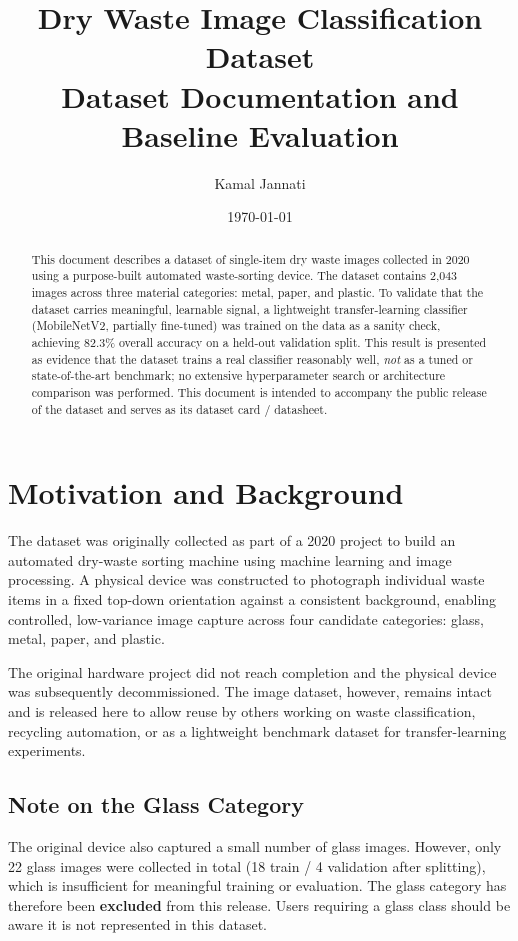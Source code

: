 \documentclass[11pt]{article}
\title{Dry Waste Image Classification Dataset \\ \large Dataset Documentation and Baseline Evaluation}
\author{Kamal Jannati}
\date{\today}
\begin{document}
\maketitle

\begin{abstract}
This document describes a dataset of single-item dry waste images collected in 2020 using a purpose-built automated waste-sorting device. The dataset contains 2{,}043 images across three material categories: metal, paper, and plastic. To validate that the dataset carries meaningful, learnable signal, a lightweight transfer-learning classifier (MobileNetV2, partially fine-tuned) was trained on the data as a sanity check, achieving 82.3\% overall accuracy on a held-out validation split. This result is presented as evidence that the dataset trains a real classifier reasonably well, \emph{not} as a tuned or state-of-the-art benchmark; no extensive hyperparameter search or architecture comparison was performed. This document is intended to accompany the public release of the dataset and serves as its dataset card / datasheet.
\end{abstract}

\tableofcontents

\section{Motivation and Background}

The dataset was originally collected as part of a 2020 project to build an automated dry-waste sorting machine using machine learning and image processing. A physical device was constructed to photograph individual waste items in a fixed top-down orientation against a consistent background, enabling controlled, low-variance image capture across four candidate categories: glass, metal, paper, and plastic.

The original hardware project did not reach completion and the physical device was subsequently decommissioned. The image dataset, however, remains intact and is released here to allow reuse by others working on waste classification, recycling automation, or as a lightweight benchmark dataset for transfer-learning experiments.

\subsection{Note on the Glass Category}
The original device also captured a small number of glass images. However, only 22 glass images were collected in total (18 train / 4 validation after splitting), which is insufficient for meaningful training or evaluation. The glass category has therefore been \textbf{excluded} from this release. Users requiring a glass class should be aware it is not represented in this dataset.
\end{document}
